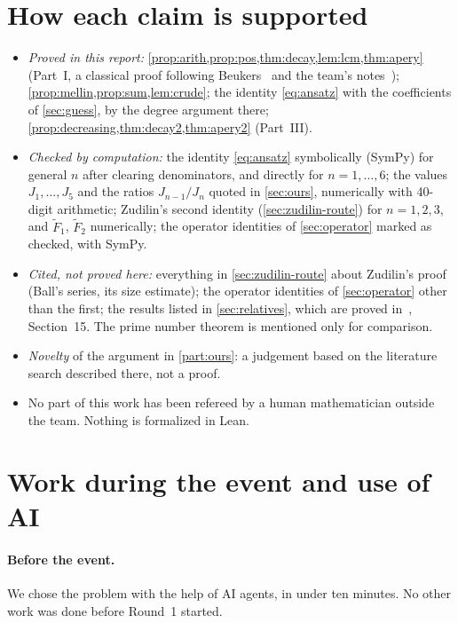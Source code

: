 \documentclass[11pt]{article}
\theoremstyle{plain}
\theoremstyle{definition}
\theoremstyle{remark}
\begin{document}
\section{How each claim is supported}\label{sec:status}

\begin{itemize}
  \item \emph{Proved in this report:} \cref{prop:arith,prop:pos,thm:decay,lem:lcm,thm:apery} (Part~I,
    a classical proof following Beukers~\cite{beukers79} and the team's notes~\cite{codexnotes});
    \cref{prop:mellin,prop:sum,lem:crude}; the identity \eqref{eq:ansatz} with the coefficients of
    \cref{sec:guess}, by the degree argument there; \cref{prop:decreasing,thm:decay2,thm:apery2} (Part~III).
  \item \emph{Checked by computation:} the identity \eqref{eq:ansatz} symbolically (SymPy) for
    general $n$ after clearing denominators, and directly for $n=1,\dots,6$; the values $J_1,\dots,J_5$
    and the ratios $J_{n-1}/J_n$ quoted in \cref{sec:ours}, numerically with 40-digit arithmetic; Zudilin's
    second identity (\cref{sec:zudilin-route}) for $n=1,2,3$, and $\widetilde F_1$, $\widetilde F_2$
    numerically; the operator identities of \cref{sec:operator} marked as checked, with SymPy.
  \item \emph{Cited, not proved here:} everything in \cref{sec:zudilin-route} about Zudilin's proof
    (Ball's series, its size estimate); the operator identities of
    \cref{sec:operator} other than the first; the results listed in
    \cref{sec:relatives}, which are proved in~\cite{codexnotes}, Section~15. The prime number theorem is mentioned only for comparison.
  \item \emph{Novelty} of the argument in \cref{part:ours}: a judgement based on the literature search
    described there, not a proof.
  \item No part of this work has been refereed by a human mathematician outside the team. Nothing
    is formalized in Lean.
\end{itemize}

\section{Work during the event and use of AI}\label{sec:ai}

\paragraph{Before the event.} We chose the problem with the help of AI agents, in under ten
minutes. No other work was done before Round~1 started.
\end{document}
